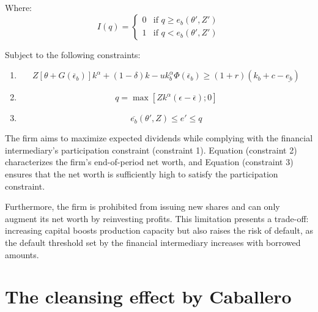 \documentclass[12pt]{article}
\begin{document}
Where:
\[
I(q)=
\begin{cases}
    0 & \text{if } q\geq e_b(\theta', Z')\\
    1 & \text{if } q< e_b(\theta', Z')
\end{cases}
\]

Subject to the following constraints:
\begin{enumerate}
    \item \label{con1}\[
    Z[\theta+G(\overline{\epsilon}_b )]k^\alpha+(1-\delta)k-uk_b^\alpha\Phi (\overline{\epsilon}_b)\geq(1+r)(k_b+c-
    \underline{e_b})
    \]
    \item \label{con2} \[
    q = \max[Zk^\alpha(\epsilon-\overline{\epsilon});0]
    \]
    \item \label{con3}\[
    \overline{e_b}(\theta',Z)\leq e'\leq q
    \]
\end{enumerate}

The firm aims to maximize expected dividends while complying with the financial intermediary's participation constraint
(constraint 1). Equation (constraint 2) characterizes the firm's end-of-period net worth, and
Equation (constraint 3) ensures that the
net worth
is sufficiently high to satisfy the participation constraint.
\par
Furthermore, the firm is prohibited from issuing new shares and can only augment its net worth by reinvesting profits.
This limitation presents a trade-off: increasing capital boosts production capacity but also raises the risk of default,
as the default threshold set by the financial intermediary increases with borrowed amounts.
\section{The cleansing effect by Caballero}
\end{document}
